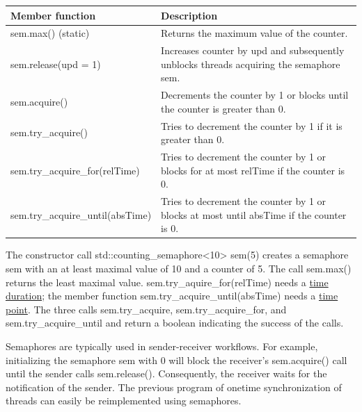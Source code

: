 \begin{table}[H]
\centering
\begin{tabular}{ll}
\textbf{Member function} & \textbf{Description}                                                       \\ \hline
sem.max() (static)       & Returns the maximum value of the counter.                                  \\
sem.release(upd = 1)             & Increases counter by upd and subsequently unblocks threads acquiring the semaphore sem.  \\
sem.acquire()            & Decrements the counter by 1 or blocks until the counter is greater than 0. \\
sem.try\_acquire()       & Tries to decrement the counter by 1 if it is greater than 0.               \\
sem.try\_acquire\_for(relTime)   & Tries to decrement the counter by 1 or blocks for at most relTime if the counter is 0.   \\
sem.try\_acquire\_until(absTime) & Tries to decrement the counter by 1 or blocks at most until absTime if the counter is 0.
\end{tabular}
\end{table}

The constructor call std::counting\_semaphore<10> sem(5) creates a semaphore sem with an at least maximal value of 10 and a counter of 5. The call sem.max() returns the least maximal value. sem.try\_aquire\_for(relTime) needs a \href{https://en.cppreference.com/w/cpp/chrono/duration}{time duration}; the member function sem.try\_acquire\_until(absTime) needs a \href{https://en.cppreference.com/w/cpp/chrono/time_point}{time point}. The three calls sem.try\_acquire, sem.try\_acquire\_for, and sem.try\_acquire\_until and return a boolean indicating the success of the calls.

Semaphores are typically used in sender-receiver workflows. For example, initializing the semaphore sem with 0 will block the receiver’s sem.acquire() call until the sender calls sem.release(). Consequently, the receiver waits for the notification of the sender. The previous program of onetime synchronization of threads can easily be reimplemented using semaphores.

